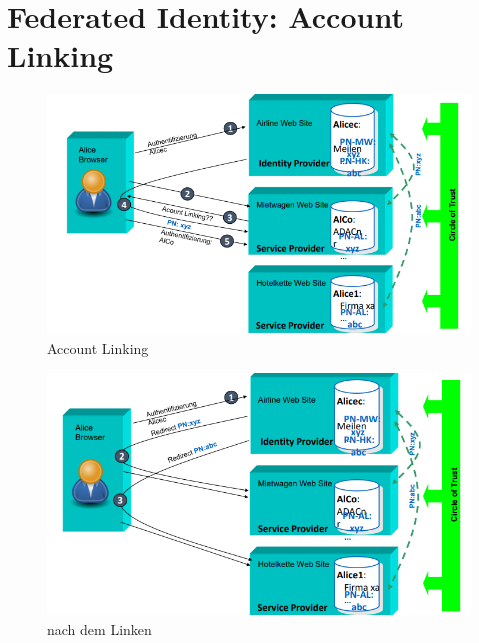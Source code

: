 \section{Federated Identity: Account Linking}
\begin{figure}[H]
	\begin{center}
		\includegraphics[scale=0.8]{Resources/FedIdent1}
		\caption{Account Linking}
		\label{fig:FedIden1}
	\end{center}
\end{figure}
\begin{figure}[H]
	\begin{center}
		\includegraphics[scale=0.8]{Resources/FedIden2}
		\caption{nach dem Linken}
		\label{fig:FedIden2}
	\end{center}
\end{figure}

